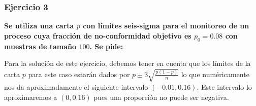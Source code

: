 \documentclass{article}
\begin{document}
\subsubsection*{Ejercicio 3} \textbf{Se utiliza una carta $p$ con límites seis-sigma para el monitoreo de un proceso cuya fracción de no-conformidad objetivo es $p_0 = 0.08$ con muestras de tamaño $100$. Se pide:}

\vspace{0.5cm}

Para la solución de este ejercicio, debemos tener en cuenta que los límites de la carta $p$ para este caso estarán dados por $p \pm 3 \sqrt{\frac{p (1-p)}{n}}$ lo que numéricamente nos da aproximadamente el siguiente intervalo $(-0.01, 0.16)$. Este intervalo lo aproximaremos a $(0, 0.16)$ pues una proporción no puede ser negativa.
\end{document}
